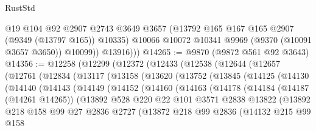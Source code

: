 \begin{lexlean}{RustStd}
\begin{coremodule}
{\begin{coremodule}
{{{{{{{{{{{{{{{{{{{{{{{{{{{{{{{{{{{{{{{              @19
              @104
              @92
              @2907
              @2743
              @3649
              @3657
              (@13792 @165 @167 @165 @2907 (@9349 (@13797 @165)) @10335)
              @10066
              @10072
              @10341
              @9969
              (@9370 (@10091 @3657 @3650))
              @10099))
          @13916)))
@14265 := @9870 (@9872 @561 @92 @3643)
@14356 := @12258
    (@12299
      (@12372
        (@12433
          (@12538
            (@12644
              (@12657
                (@12761
                  (@12834
                    (@13117
                      (@13158
                        (@13620
                          (@13752
                            (@13845
                              (@14125
                                (@14130
                                  (@14140
                                    (@14143
                                      (@14149
                                        (@14152
                                          (@14160
                                            (@14163
                                              (@14178
                                                (@14184
                                                  (@14187 (@14261 @14265))
                                                  (@13892
                                                    @528
                                                    @220
                                                    @22
                                                    @101
                                                    @3571
                                                    @2838
                                                    @13822
                                                    (@13892
                                                      @218
                                                      @158
                                                      @99
                                                      @27
                                                      @2836
                                                      @2727
                                                      (@13872
                                                        @218
                                                        @99
                                                        @2836
                                                        (@14132
                                                          @215
                                                          @99
                                                          @158
}}}}}}}}}}}}}}}}}}}}}}}}}}}}}}}}}}}}}}}
\end{coremodule}}
\end{coremodule}
\end{lexlean}
